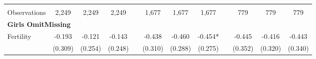 \begin{landscape}
\begin{table}[htpb!]
\begin{center}
\begin{tabular}{lcccp{2mm}cccp{2mm}ccc}
\begin{footnotesize}\end{footnotesize}&\begin{footnotesize}\end{footnotesize}&\begin{footnotesize}\end{footnotesize}&\begin{footnotesize}\end{footnotesize}&\begin{footnotesize}\end{footnotesize}&\begin{footnotesize}\end{footnotesize}&\begin{footnotesize}\end{footnotesize}&\begin{footnotesize}\end{footnotesize}&\begin{footnotesize}\end{footnotesize}&\begin{footnotesize}\end{footnotesize}&\begin{footnotesize}\end{footnotesize}&\begin{footnotesize}\end{footnotesize}\\Observations&2,249&2,249&2,249&&1,677&1,677&1,677&&779&779&779\\
\multicolumn{12}{l}{\textbf{Girls OmitMissing}}\\ 
Fertility&-0.193&-0.121&-0.143&&-0.438&-0.460&-0.454*&&-0.445&-0.416&-0.443\\
&(0.309)&(0.254)&(0.248)&&(0.310)&(0.288)&(0.275)&&(0.352)&(0.320)&(0.340)\\

\end{tabular}
\end{center}
\end{table}
\end{landscape}
